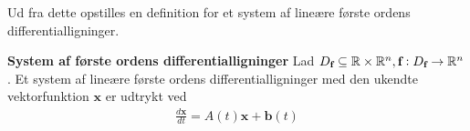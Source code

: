 Ud fra dette opstilles en definition for et system af lineære første ordens differentialligninger.
%
\begin{minipage}\textwidth
\begin{defn}\textbf{System af første ordens differentialligninger} %
\newline
Lad $D_\textbf{f} \subseteq \mathbb{R} \times \mathbb{R}^{n}, \textbf{f}:D_\textbf{f} \to \mathbb{R}^n$. Et system af lineære første ordens differentialligninger med den ukendte vektorfunktion $\textbf{x}$ er udtrykt ved
\begin{align}
    \frac{d\textbf{x}}{dt} = A(t)\textbf{x} + \textbf{b}(t)
\end{align}
\end{defn}
\end{minipage}
